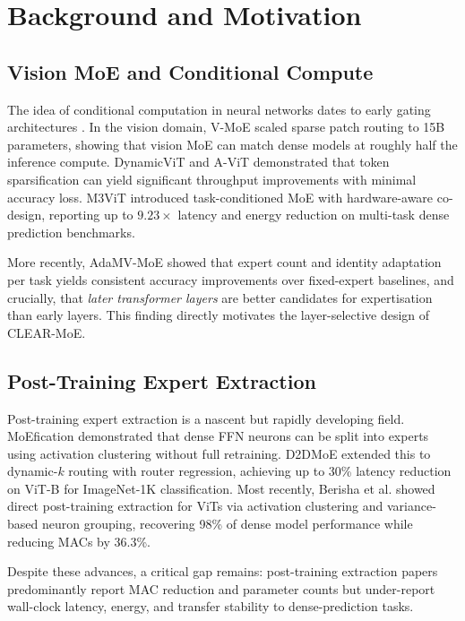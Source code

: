 \documentclass[conference]{IEEEtran}
\begin{document}
\section{Background and Motivation}
\label{sec:background}

\subsection{Vision MoE and Conditional Compute}

The idea of conditional computation in neural networks dates to early gating architectures \cite{shazeer2017outrageously}. In the vision domain, V-MoE \cite{riquelme2021vmoe} scaled sparse patch routing to 15B parameters, showing that vision MoE can match dense models at roughly half the inference compute. DynamicViT \cite{rao2021dynamicvit} and A-ViT \cite{yin2022avit} demonstrated that token sparsification can yield significant throughput improvements with minimal accuracy loss. M3ViT \cite{fan2022m3vit} introduced task-conditioned MoE with hardware-aware co-design, reporting up to $9.23\times$ latency and energy reduction on multi-task dense prediction benchmarks.

More recently, AdaMV-MoE \cite{chen2023adamvmoe} showed that expert count and identity adaptation per task yields consistent accuracy improvements over fixed-expert baselines, and crucially, that \textit{later transformer layers} are better candidates for expertisation than early layers. This finding directly motivates the layer-selective design of CLEAR-MoE.

\subsection{Post-Training Expert Extraction}

Post-training expert extraction is a nascent but rapidly developing field. MoEfication \cite{zhang2022moefication} demonstrated that dense FFN neurons can be split into experts using activation clustering without full retraining. D2DMoE \cite{d2dmoe2024} extended this to dynamic-$k$ routing with router regression, achieving up to 30\% latency reduction on ViT-B for ImageNet-1K classification. Most recently, Berisha et al. \cite{berisha2025cvpr} showed direct post-training extraction for ViTs via activation clustering and variance-based neuron grouping, recovering 98\% of dense model performance while reducing MACs by 36.3\%.

Despite these advances, a critical gap remains: post-training extraction papers predominantly report MAC reduction and parameter counts but under-report wall-clock latency, energy, and transfer stability to dense-prediction tasks.
\end{document}
